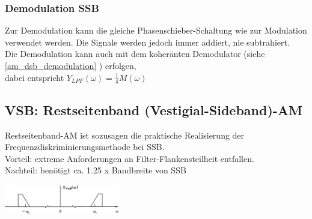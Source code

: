 \subsubsection{Demodulation SSB}
Zur Demodulation kann die gleiche Phasenschieber-Schaltung wie zur Modulation verwendet
werden. Die Signale werden jedoch immer addiert, nie subtrahiert. \\
Die Demodulation kann auch mit dem koheränten Demodulator (siehe \ref{am_dsb_demodulation} ) erfolgen,\\
 dabei entspricht $Y_{LPF}(\omega) = \frac{1}{4}M(\omega)$ \\



\subsection{VSB: Restseitenband (Vestigial-Sideband)-AM}
	\begin{minipage}{12cm}
		Restseitenband-AM ist sozusagen die praktische Realisierung der Frequenzdiskriminierungsmethode bei
		SSB. \\
		Vorteil: extreme Anforderungen an Filter-Flankensteilheit entfallen.\\
		Nachteil: ben\"otigt ca. 1.25 x Bandbreite von SSB
	\end{minipage}
	\begin{minipage}{5cm}
		\begin{center}
		    \includegraphics[width=5cm]{bilder/am_vsb_spektrum.png}
		\end{center}
	\end{minipage}
	
